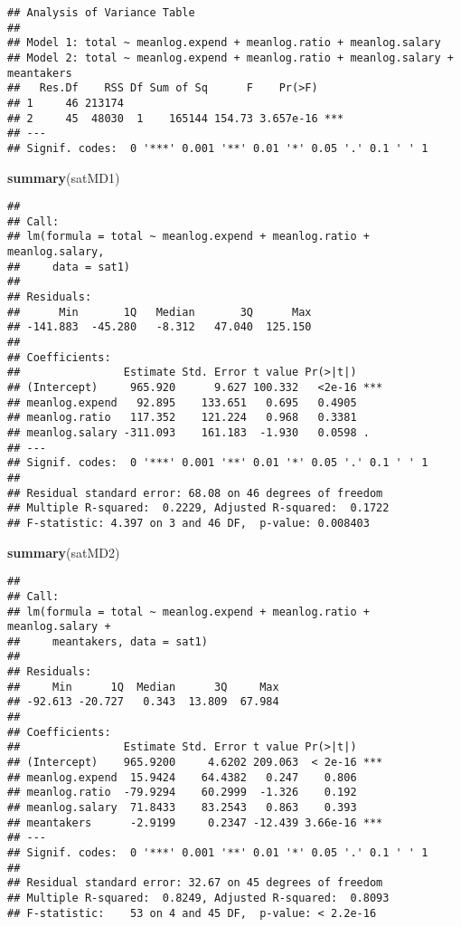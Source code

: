 \documentclass[]{article}
\newenvironment{Shaded}{\begin{snugshade}}{\end{snugshade}}
\newcommand{\KeywordTok}[1]{\textcolor[rgb]{0.13,0.29,0.53}{\textbf{#1}}}
\newcommand{\NormalTok}[1]{#1}
\begin{document}
\begin{verbatim}
## Analysis of Variance Table
## 
## Model 1: total ~ meanlog.expend + meanlog.ratio + meanlog.salary
## Model 2: total ~ meanlog.expend + meanlog.ratio + meanlog.salary + meantakers
##   Res.Df    RSS Df Sum of Sq      F    Pr(>F)    
## 1     46 213174                                  
## 2     45  48030  1    165144 154.73 3.657e-16 ***
## ---
## Signif. codes:  0 '***' 0.001 '**' 0.01 '*' 0.05 '.' 0.1 ' ' 1
\end{verbatim}

\begin{Shaded}
\begin{Highlighting}[]
\KeywordTok{summary}\NormalTok{(satMD1)}
\end{Highlighting}
\end{Shaded}

\begin{verbatim}
## 
## Call:
## lm(formula = total ~ meanlog.expend + meanlog.ratio + meanlog.salary, 
##     data = sat1)
## 
## Residuals:
##      Min       1Q   Median       3Q      Max 
## -141.883  -45.280   -8.312   47.040  125.150 
## 
## Coefficients:
##                Estimate Std. Error t value Pr(>|t|)    
## (Intercept)     965.920      9.627 100.332   <2e-16 ***
## meanlog.expend   92.895    133.651   0.695   0.4905    
## meanlog.ratio   117.352    121.224   0.968   0.3381    
## meanlog.salary -311.093    161.183  -1.930   0.0598 .  
## ---
## Signif. codes:  0 '***' 0.001 '**' 0.01 '*' 0.05 '.' 0.1 ' ' 1
## 
## Residual standard error: 68.08 on 46 degrees of freedom
## Multiple R-squared:  0.2229, Adjusted R-squared:  0.1722 
## F-statistic: 4.397 on 3 and 46 DF,  p-value: 0.008403
\end{verbatim}

\begin{Shaded}
\begin{Highlighting}[]
\KeywordTok{summary}\NormalTok{(satMD2)}
\end{Highlighting}
\end{Shaded}

\begin{verbatim}
## 
## Call:
## lm(formula = total ~ meanlog.expend + meanlog.ratio + meanlog.salary + 
##     meantakers, data = sat1)
## 
## Residuals:
##     Min      1Q  Median      3Q     Max 
## -92.613 -20.727   0.343  13.809  67.984 
## 
## Coefficients:
##                Estimate Std. Error t value Pr(>|t|)    
## (Intercept)    965.9200     4.6202 209.063  < 2e-16 ***
## meanlog.expend  15.9424    64.4382   0.247    0.806    
## meanlog.ratio  -79.9294    60.2999  -1.326    0.192    
## meanlog.salary  71.8433    83.2543   0.863    0.393    
## meantakers      -2.9199     0.2347 -12.439 3.66e-16 ***
## ---
## Signif. codes:  0 '***' 0.001 '**' 0.01 '*' 0.05 '.' 0.1 ' ' 1
## 
## Residual standard error: 32.67 on 45 degrees of freedom
## Multiple R-squared:  0.8249, Adjusted R-squared:  0.8093 
## F-statistic:    53 on 4 and 45 DF,  p-value: < 2.2e-16
\end{verbatim}
\end{document}
